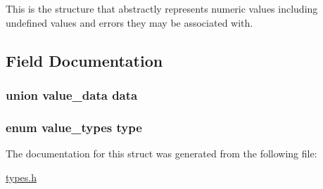 This is the structure that abstractly represents numeric values including undefined values and errors they may be associated with. 

\subsection{Field Documentation}
\hypertarget{structvalue_a7a505de18bdf859cc9246069c70c18b5}{
\subsubsection[{data}]{\setlength{\rightskip}{0pt plus 5cm}union {\bf value\+\_\+data} data}}\label{structvalue_a7a505de18bdf859cc9246069c70c18b5}
\hypertarget{structvalue_a51293d8a9946f28f389010bf83820015}{
\subsubsection[{type}]{\setlength{\rightskip}{0pt plus 5cm}enum {\bf value\+\_\+types} type}}\label{structvalue_a51293d8a9946f28f389010bf83820015}


The documentation for this struct was generated from the following file\+:\begin{DoxyCompactItemize}
\item 
\hyperlink{types_8h}{types.\+h}\end{DoxyCompactItemize}

